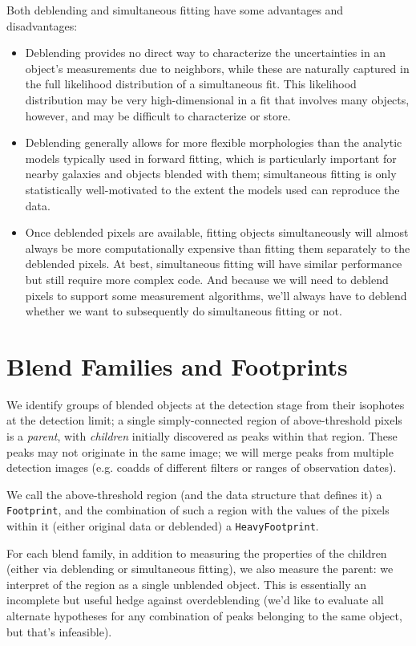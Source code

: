 \documentclass[10pt]{article}
\begin{document}
Both deblending and simultaneous fitting have some advantages and
disadvantages:
\begin{itemize}
\item Deblending provides no direct way to characterize the uncertainties in
      an object's measurements due to neighbors, while these are naturally
      captured in the full likelihood distribution of a simultaneous fit.
      This likelihood distribution may be very high-dimensional in a fit that
      involves many objects, however, and may be difficult to characterize or
      store.
\item Deblending generally allows for more flexible morphologies than the
      analytic models typically used in forward fitting, which is particularly
      important for nearby galaxies and objects blended with them;
      simultaneous fitting is only statistically well-motivated to the extent
      the models used can reproduce the data.
\item Once deblended pixels are available, fitting objects simultaneously will
      almost always be more computationally expensive than fitting them
      separately to the deblended pixels.  At best, simultaneous fitting will
      have similar performance but still require more complex code.  And
      because we will need to deblend pixels to support some measurement
      algorithms, we'll always have to deblend whether we want to subsequently
      do simultaneous fitting or not.
\end{itemize}

\section{Blend Families and Footprints}

We identify groups of blended objects at the detection stage from their
isophotes at the detection limit; a single simply-connected region of
above-threshold pixels is a {\em parent}, with {\em children} initially
discovered as peaks within that region.  These peaks may not originate in
the same image; we will merge peaks from multiple detection images (e.g.
coadds of different filters or ranges of observation dates).

We call the above-threshold region (and the data structure that defines it) a
\texttt{Footprint}, and the combination of such a region with the values of
the pixels within it (either original data or deblended) a \texttt
{HeavyFootprint}.

For each blend family, in addition to measuring the properties of the children
(either via deblending or simultaneous fitting), we also measure the parent:
we interpret of the region as a single unblended object. This is essentially
an incomplete but useful hedge against overdeblending (we'd like to evaluate
all alternate hypotheses for any combination of peaks belonging to the same
object, but that's infeasible).
\end{document}
